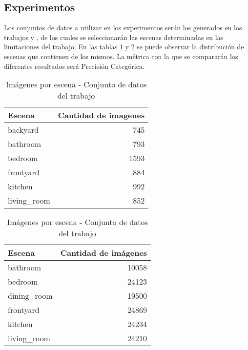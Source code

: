 \subsection{Experimentos}
Los conjuntos de datos a utilizar en los experimentos serán los generados en los trabajos \cite{vision_based_real_estate_price_estimation} y \cite{lstm_real_estate}, de los cuales se seleccionarán las escenas determinadas en las limitaciones del trabajo. En las tablas \ref{exp:distribution_rei} y \ref{exp:distribution_vision_based} se puede observar la distribución de escenas que contienen de los mismos. La métrica con la que se compararán los diferentes resultados será Precisión Categórica.

\begin{table}[h!]
	\centering
	\begin{tabular}{| l | r | }
		\toprule
		Escena &  Cantidad de imagenes \\
		\midrule
		backyard &       745 \\
		bathroom &       793 \\
		bedroom &      1593 \\
		frontyard &       884 \\
		kitchen &       992 \\
		living\_room &       852 \\
		\bottomrule
	\end{tabular}
	\caption{Imágenes por escena - Conjunto de datos del trabajo \cite{lstm_real_estate}}
	\label{exp:distribution_rei}
\end{table}

\begin{table}[h!]
	\centering
	\begin{tabular}{| l | r | }
		\toprule
		Escena &  Cantidad de imágenes \\
		\midrule
		bathroom & 10058 \\
		bedroom & 24123 \\
		dining\_room & 19500 \\
		frontyard & 24869 \\
		kitchen & 24234 \\
		living\_room & 24210 \\
		\bottomrule
	\end{tabular}
	\caption{Imágenes por escena - 	Conjunto de datos del trabajo \cite{vision_based_real_estate_price_estimation}}
	\label{exp:distribution_vision_based}
\end{table}

